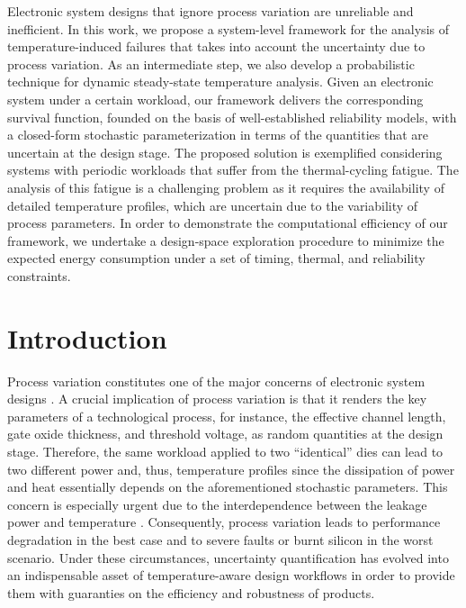 Electronic system designs that ignore process variation are unreliable and
inefficient. In this work, we propose a system-level framework for the analysis
of temperature-induced failures that takes into account the uncertainty due to
process variation. As an intermediate step, we also develop a probabilistic
technique for dynamic steady-state temperature analysis. Given an electronic
system under a certain workload, our framework delivers the corresponding
survival function, founded on the basis of well-established reliability models,
with a closed-form stochastic parameterization in terms of the quantities that
are uncertain at the design stage. The proposed solution is exemplified
considering systems with periodic workloads that suffer from the thermal-cycling
fatigue. The analysis of this fatigue is a challenging problem as it requires
the availability of detailed temperature profiles, which are uncertain due to
the variability of process parameters. In order to demonstrate the computational
efficiency of our framework, we undertake a design-space exploration procedure
to minimize the expected energy consumption under a set of timing, thermal, and
reliability constraints.

\section{Introduction}

Process variation constitutes one of the major concerns of electronic system
designs \cite{srivastava2010}. A crucial implication of process variation is
that it renders the key parameters of a technological process, for instance, the
effective channel length, gate oxide thickness, and threshold voltage, as random
quantities at the design stage. Therefore, the same workload applied to two
``identical'' dies can lead to two different power and, thus, temperature
profiles since the dissipation of power and heat essentially depends on the
aforementioned stochastic parameters. This concern is especially urgent due to
the interdependence between the leakage power and temperature \cite{liu2007}.
Consequently, process variation leads to performance degradation in the best
case and to severe faults or burnt silicon in the worst scenario. Under these
circumstances, uncertainty quantification \cite{maitre2010} has evolved into an
indispensable asset of temperature-aware design workflows in order to provide
them with guaranties on the efficiency and robustness of products.

